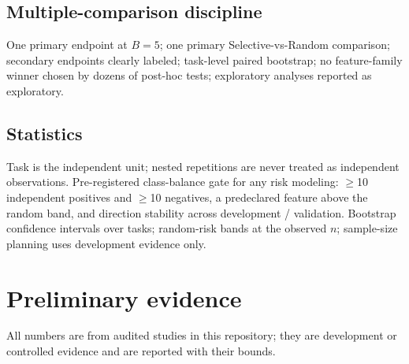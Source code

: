 \documentclass[11pt,a4paper]{article}
\begin{document}
\subsection{Multiple-comparison discipline}
One primary endpoint at $B{=}5$; one primary Selective-vs-Random comparison;
secondary endpoints clearly labeled; task-level paired bootstrap; no
feature-family winner chosen by dozens of post-hoc tests; exploratory analyses
reported as exploratory.

\subsection{Statistics}
Task is the independent unit; nested repetitions are never treated as
independent observations. Pre-registered class-balance gate for any risk
modeling: $\ge$10 independent positives and $\ge$10 negatives, a predeclared
feature above the random band, and direction stability across development /
validation. Bootstrap confidence intervals over tasks; random-risk bands at the
observed $n$; sample-size planning uses development evidence only.

\section{Preliminary evidence}
\label{sec:prelim}

All numbers are from audited studies in this repository; they are development
or controlled evidence and are reported with their bounds.
\end{document}
